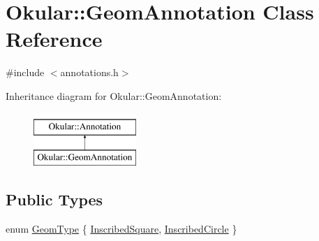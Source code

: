 \hypertarget{classOkular_1_1GeomAnnotation}{\section{Okular\+:\+:Geom\+Annotation Class Reference}
\label{classOkular_1_1GeomAnnotation}
}


{\ttfamily \#include $<$annotations.\+h$>$}

Inheritance diagram for Okular\+:\+:Geom\+Annotation\+:\begin{figure}[H]
\begin{center}
\leavevmode
\includegraphics[height=2.000000cm]{classOkular_1_1GeomAnnotation}
\end{center}
\end{figure}
\subsection*{Public Types}
\begin{DoxyCompactItemize}
\item 
enum \hyperlink{classOkular_1_1GeomAnnotation_a511623ed10a8d1f18cfd5987fadee682}{Geom\+Type} \{ \hyperlink{classOkular_1_1GeomAnnotation_a511623ed10a8d1f18cfd5987fadee682a5c7718299cc7aad186005a1bd0c86e9e}{Inscribed\+Square}, 
\hyperlink{classOkular_1_1GeomAnnotation_a511623ed10a8d1f18cfd5987fadee682a30a6611d755c0404efaf196327194bfc}{Inscribed\+Circle}
 \}
\end{DoxyCompactItemize}
